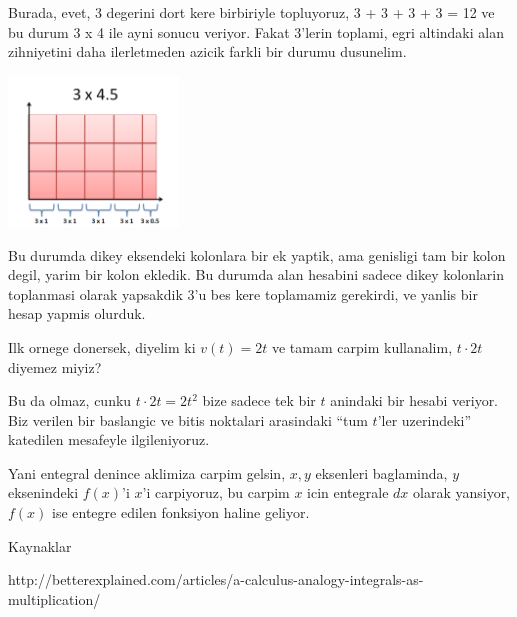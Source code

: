 \documentclass[12pt,fleqn]{article}
\begin{document}
Burada, evet, 3 degerini dort kere birbiriyle topluyoruz, 3 + 3 + 3 + 3 =
12 ve bu durum 3 x 4 ile ayni sonucu veriyor. Fakat 3'lerin toplami, egri
altindaki alan zihniyetini daha ilerletmeden azicik farkli bir durumu
dusunelim. 

\includegraphics[height=4cm]{piecewise-multiplication.png}

Bu durumda dikey eksendeki kolonlara bir ek yaptik, ama genisligi tam bir
kolon degil, yarim bir kolon ekledik. Bu durumda alan hesabini sadece dikey
kolonlarin toplanmasi olarak yapsakdik 3'u bes kere toplamamiz gerekirdi,
ve yanlis bir hesap yapmis olurduk.

Ilk ornege donersek, diyelim ki $v(t) = 2t$ ve tamam carpim kullanalim,
$t
\cdot 2t$ diyemez miyiz? 

Bu da olmaz, cunku $t\cdot 2t = 2t^2$ bize sadece tek bir $t$ anindaki bir
hesabi veriyor. Biz verilen bir baslangic ve bitis noktalari arasindaki
``tum $t$'ler uzerindeki'' katedilen mesafeyle ilgileniyoruz.  

Yani entegral denince aklimiza carpim gelsin, $x,y$ eksenleri baglaminda,
$y$ eksenindeki $f(x)$'i $x$'i carpiyoruz, bu carpim $x$ icin entegrale
$dx$ olarak yansiyor, $f(x)$ ise entegre edilen fonksiyon haline geliyor. 

Kaynaklar

http://betterexplained.com/articles/a-calculus-analogy-integrals-as-multiplication/
\end{document}
